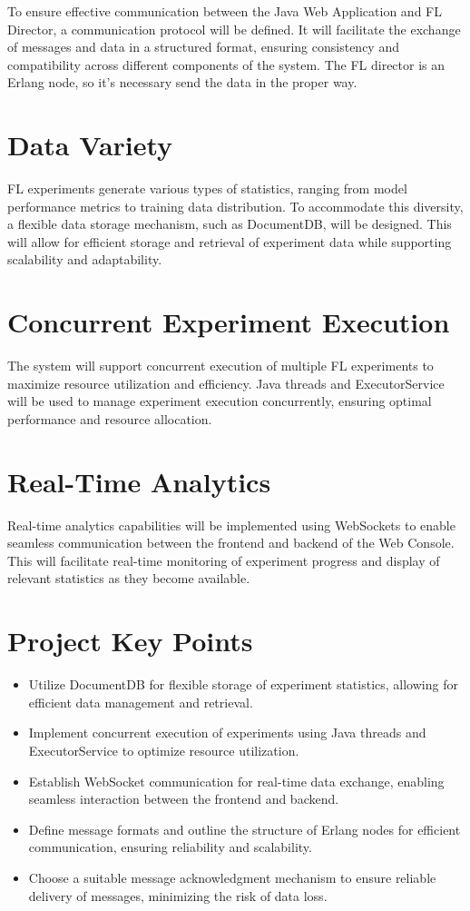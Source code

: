 To ensure effective communication between the Java Web Application and FL Director, a communication protocol will be defined. It will facilitate the exchange of messages and data in a structured format, ensuring consistency and compatibility across different components of the system. The FL director is an Erlang node, so it's necessary send the data in the proper way.

\section{Data Variety}

FL experiments generate various types of statistics, ranging from model performance metrics to training data distribution. To accommodate this diversity, a flexible data storage mechanism, such as DocumentDB, will be designed. This will allow for efficient storage and retrieval of experiment data while supporting scalability and adaptability.

\section{Concurrent Experiment Execution}

The system will support concurrent execution of multiple FL experiments to maximize resource utilization and efficiency. Java threads and ExecutorService will be used to manage experiment execution concurrently, ensuring optimal performance and resource allocation.

\section{Real-Time Analytics}

Real-time analytics capabilities will be implemented using WebSockets to enable seamless communication between the frontend and backend of the Web Console. This will facilitate real-time monitoring of experiment progress and display of relevant statistics as they become available.

\section{Project Key Points}

\begin{itemize}
    \item Utilize DocumentDB for flexible storage of experiment statistics, allowing for efficient data management and retrieval.
    \item Implement concurrent execution of experiments using Java threads and ExecutorService to optimize resource utilization.
    \item Establish WebSocket communication for real-time data exchange, enabling seamless interaction between the frontend and backend.
    \item Define message formats and outline the structure of Erlang nodes for efficient communication, ensuring reliability and scalability.
    \item Choose a suitable message acknowledgment mechanism to ensure reliable delivery of messages, minimizing the risk of data loss.
\end{itemize}


